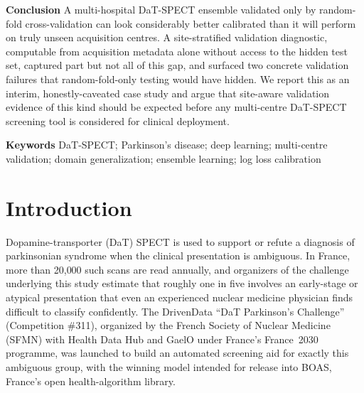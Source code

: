 \documentclass[11pt]{article}
\begin{document}
\smallskip
\noindent\textbf{Conclusion} A multi-hospital DaT-SPECT ensemble validated only by random-fold cross-validation can look considerably better calibrated than it will perform on truly unseen acquisition centres. A site-stratified validation diagnostic, computable from acquisition metadata alone without access to the hidden test set, captured part but not all of this gap, and surfaced two concrete validation failures that random-fold-only testing would have hidden. We report this as an interim, honestly-caveated case study and argue that site-aware validation evidence of this kind should be expected before any multi-centre DaT-SPECT screening tool is considered for clinical deployment.

\bigskip
\noindent\textbf{Keywords} DaT-SPECT; Parkinson's disease; deep learning; multi-centre validation; domain generalization; ensemble learning; log loss calibration

\section*{Introduction}

Dopamine-transporter (DaT) SPECT is used to support or refute a diagnosis of parkinsonian syndrome when the clinical presentation is ambiguous. In France, more than 20{,}000 such scans are read annually, and organizers of the challenge underlying this study estimate that roughly one in five involves an early-stage or atypical presentation that even an experienced nuclear medicine physician finds difficult to classify confidently. The DrivenData ``DaT Parkinson's Challenge'' (Competition \#311), organized by the French Society of Nuclear Medicine (SFMN) with Health Data Hub and GaelO under France's France~2030 programme, was launched to build an automated screening aid for exactly this ambiguous group, with the winning model intended for release into BOAS, France's open health-algorithm library.
\end{document}
